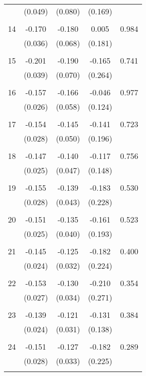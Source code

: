 \begin{tabular}{l*{1}{cccc}}
          & (0.049) & (0.080) & (0.169) & \\
 & & & &\\
  14       & -0.170 & -0.180 & 0.005 & 0.984 \\
          & (0.036) & (0.068) & (0.181) & \\
 & & & &\\
  15       & -0.201 & -0.190 & -0.165 & 0.741 \\
          & (0.039) & (0.070) & (0.264) & \\
 & & & &\\
  16       & -0.157 & -0.166 & -0.046 & 0.977 \\
          & (0.026) & (0.058) & (0.124) & \\
 & & & &\\
  17       & -0.154 & -0.145 & -0.141 & 0.723 \\
          & (0.028) & (0.050) & (0.196) & \\
 & & & &\\
  18       & -0.147 & -0.140 & -0.117 & 0.756 \\
          & (0.025) & (0.047) & (0.148) & \\
 & & & &\\
  19       & -0.155 & -0.139 & -0.183 & 0.530 \\
          & (0.028) & (0.043) & (0.228) & \\
 & & & &\\
  20       & -0.151 & -0.135 & -0.161 & 0.523 \\
          & (0.025) & (0.040) & (0.193) & \\
 & & & &\\
  21       & -0.145 & -0.125 & -0.182 & 0.400 \\
          & (0.024) & (0.032) & (0.224) & \\
 & & & &\\
  22       & -0.153 & -0.130 & -0.210 & 0.354 \\
          & (0.027) & (0.034) & (0.271) & \\
 & & & &\\
  23       & -0.139 & -0.121 & -0.131 & 0.384 \\
          & (0.024) & (0.031) & (0.138) & \\
 & & & &\\
  24       & -0.151 & -0.127 & -0.182 & 0.289 \\
          & (0.028) & (0.033) & (0.225) & \\
 & & & &\\

\end{tabular}
